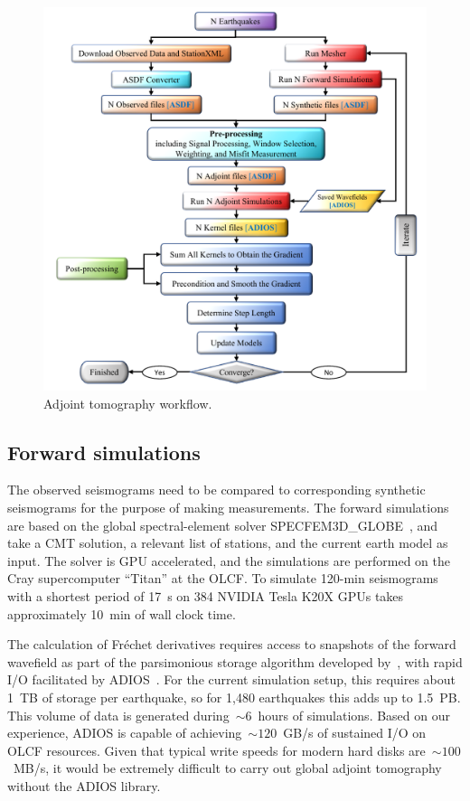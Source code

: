 \begin{figure}
  \centering
  \includegraphics[width=\textwidth]{ch-GLADM25/figures/adjoint_workflow_6.pdf}
  \caption{\small{Adjoint tomography workflow.}}
  \label{fig:adjoint_workflow}
\end{figure}

\subsection{Forward simulations}

The observed seismograms need to be compared to corresponding synthetic seismograms
for the purpose of making measurements.
The forward simulations are based on the global spectral-element solver
SPECFEM3D\_GLOBE~\cite{KoTr02a,KoTr02a}, and take a CMT solution, a relevant list
of stations, and the current earth model as input.
The solver is GPU accelerated, and the simulations are performed on the Cray supercomputer ``Titan''
at the OLCF.
To simulate 120-min seismograms with a shortest period of 17~s on 384 NVIDIA
Tesla K20X GPUs takes approximately 10~min of wall clock time.

The calculation of Fr\'echet derivatives requires
access to snapshots of the forward wavefield as part of the parsimonious storage
algorithm developed by~\cite{KoXiBoPeSaLiTr16},
with rapid I/O facilitated by ADIOS~\cite{liu2014hello}.
For the current simulation setup,
this requires about 1~TB of storage per earthquake,
so for 1,480 earthquakes this adds up to 1.5~PB.
This volume of data is generated during~$\sim6$~hours of simulations.
Based on our experience, ADIOS is capable of achieving~$\sim120$~GB/s
of sustained I/O on OLCF resources.
Given that typical write speeds for modern hard disks are~$\sim100$~MB/s,
it would be extremely difficult to carry out global adjoint tomography without the ADIOS library.

